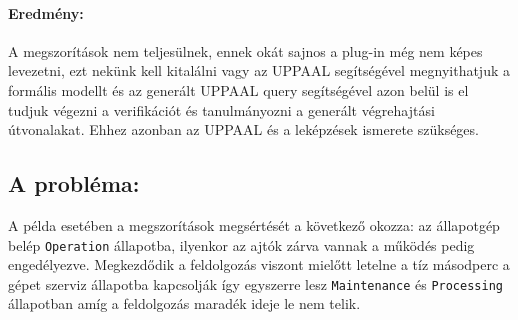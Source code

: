 \paragraph{Eredmény:} A megszorítások nem teljesülnek, ennek okát sajnos a plug-in még nem képes levezetni, ezt nekünk kell kitalálni vagy az UPPAAL segítségével megnyithatjuk a formális modellt és az generált UPPAAL query segítségével azon belül is el tudjuk végezni a verifikációt és tanulmányozni a generált végrehajtási útvonalakat. Ehhez azonban az UPPAAL és a leképzések ismerete szükséges.
\subsection{A probléma:} A példa esetében a megszorítások megsértését a következő okozza: az állapotgép belép \verb+Operation+ állapotba, ilyenkor az ajtók zárva vannak a működés pedig engedélyezve. Megkezdődik a feldolgozás viszont mielőtt letelne a tíz másodperc a gépet szerviz állapotba kapcsolják így egyszerre lesz \verb+Maintenance+ és \verb+Processing+ állapotban amíg a feldolgozás maradék ideje le nem telik.

